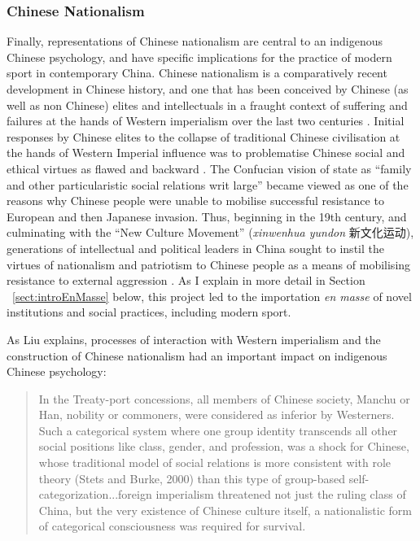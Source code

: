 \begin{CJK}{UTF8}{gbsn}
\subsubsection{Chinese Nationalism}
Finally, representations of Chinese nationalism are central to an indigenous Chinese psychology, and have specific implications for the practice of modern sport in contemporary China.  Chinese nationalism is a comparatively recent development in Chinese history, and one that has been conceived by Chinese (as well as non Chinese) elites and intellectuals in a fraught context of suffering and failures at the hands of Western imperialism over the last two centuries \cite{Liu2009,Liu1995}.  Initial responses by Chinese elites to the collapse of traditional Chinese civilisation at the hands of Western Imperial influence was to problematise Chinese social and ethical virtues as flawed and backward \citep[see][]{Levenson1959}.  The Confucian vision of state as ``family and other particularistic social relations writ large'' became viewed as one of the reasons why Chinese people were unable to mobilise successful resistance to European and then Japanese invasion.  Thus, beginning in the 19th century, and culminating with the ``New Culture Movement'' (\textit{xinwenhua yundon} 新文化运动), generations of intellectual and political leaders in China sought to instil the virtues of nationalism and patriotism to Chinese people as a means of mobilising resistance to external aggression \citep{Pye1996}.  As I explain in more detail in Section ~\ref{sect:introEnMasse} below, this project led to the importation \textit{en masse} of novel institutions and social practices, including modern sport.

As Liu explains, processes of interaction with Western imperialism and the construction of Chinese nationalism had an important impact on indigenous Chinese psychology:

\begin{quote}
  In the Treaty-port concessions, all members of Chinese society, Manchu or Han, nobility or commoners, were considered as inferior by Westerners.  Such a categorical system where one group identity transcends all other social positions like class, gender, and profession, was a shock for Chinese, whose traditional model of social relations is more consistent with role theory (Stets and Burke, 2000) than this type of group-based self-categorization...foreign imperialism threatened not just the ruling class of China, but the very existence of Chinese culture itself, a nationalistic form of categorical consciousness was required for survival.  \citep[584-5]{Liu2009}
\end{quote}


\end{CJK}
